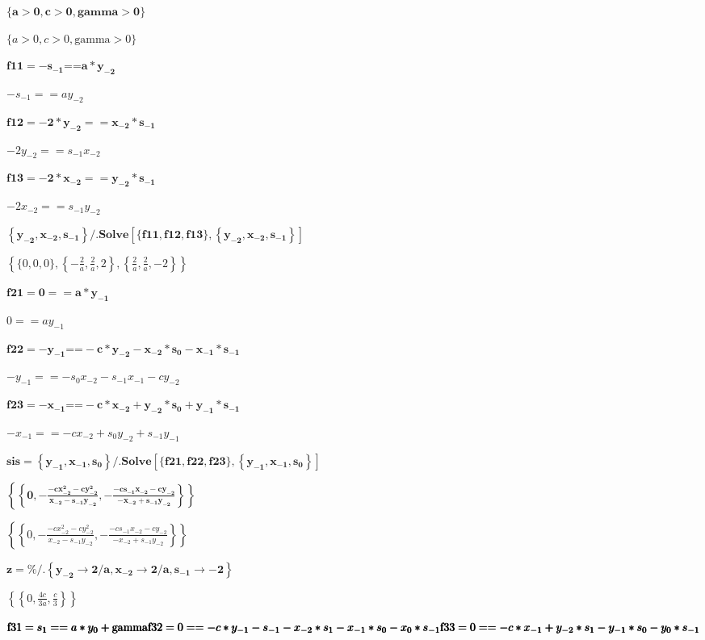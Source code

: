 \documentclass{article}
\begin{document}
\noindent\(\pmb{\{a>0,c>0,\text{gamma}>0\}}\)

\noindent\(\{a>0,c>0,\text{gamma}>0\}\)

\noindent\(\pmb{\text{f11} = -s_{-1}\text{==}a*y_{-2}}\)

\noindent\(-s_{-1}==a y_{-2}\)

\noindent\(\pmb{\text{f12} = -2*y_{-2}==x_{-2}*s_{-1}}\)

\noindent\(-2 y_{-2}==s_{-1} x_{-2}\)

\noindent\(\pmb{\text{f13} =-2*x_{-2}==y_{-2}*s_{-1} }\)

\noindent\(-2 x_{-2}==s_{-1} y_{-2}\)

\noindent\(\pmb{\left\{y_{-2},x_{-2},s_{-1}\right\}\text{/.}\text{Solve}\left[\{\text{f11},\text{f12},\text{f13}\},\left\{y_{-2},x_{-2},s_{-1}\right\}\right]}\)

\noindent\(\left\{\{0,0,0\},\left\{-\frac{2}{a},\frac{2}{a},2\right\},\left\{\frac{2}{a},\frac{2}{a},-2\right\}\right\}\)

\noindent\(\pmb{\text{f21}=0==a*y_{-1}}\)

\noindent\(0==a y_{-1}\)

\noindent\(\pmb{\text{f22}=-y_{-1}\text{==}-c*y_{-2}-x_{-2}*s_0-x_{-1}*s_{-1}}\)

\noindent\(-y_{-1}==-s_0 x_{-2}-s_{-1} x_{-1}-c y_{-2}\)

\noindent\(\pmb{\text{f23}=-x_{-1}\text{==}-c*x_{-2}+y_{-2}*s_0+y_{-1}*s_{-1}}\)

\noindent\(-x_{-1}==-c x_{-2}+s_0 y_{-2}+s_{-1} y_{-1}\)

\noindent\(\pmb{\text{sis}=\left\{y_{-1},x_{-1},s_0\right\}\text{/.}\text{Solve}\left[\{\text{f21},\text{f22},\text{f23}\},\left\{y_{-1},x_{-1},s_0\right\}\right]}\)

\noindent\(\pmb{\left\{\left\{0,-\frac{-c x_{-2}^2-c y_{-2}^2}{x_{-2}-s_{-1} y_{-2}},-\frac{-c s_{-1} x_{-2}-c y_{-2}}{-x_{-2}+s_{-1} y_{-2}}\right\}\right\}}\)

\noindent\(\left\{\left\{0,-\frac{-c x_{-2}^2-c y_{-2}^2}{x_{-2}-s_{-1} y_{-2}},-\frac{-c s_{-1} x_{-2}-c y_{-2}}{-x_{-2}+s_{-1} y_{-2}}\right\}\right\}\)

\noindent\(\pmb{z=\%\text{/.}\left\{y_{-2}\to 2/a,x_{-2}\to 2/a,s_{-1}\to -2\right\}}\)

\noindent\(\left\{\left\{0,\frac{4 c}{3 a},\frac{c}{3}\right\}\right\}\)

\noindent\(\pmb{\text{f31}=s_1==a*y_0+\text{gamma}}\\
\pmb{\text{f32}=0==-c*y_{-1}-s_{-1}-x_{-2}*s_1-x_{-1}*s_0-x_0*s_{-1}}\\
\pmb{\text{f33}=0==-c*x_{-1}+y_{-2}*s_1-y_{-1}*s_0-y_0*s_{-1}}\)
\end{document}
